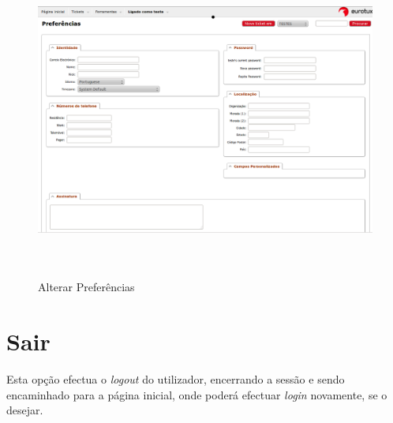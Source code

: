 \begin{figure}[H]
\begin{center}
\includegraphics[width=16cm,height=10.5cm]{include/img/rt5-1-PT}
\end{center}
\caption{Alterar Preferências}
\label{fig:boot}
\end{figure}

\section{Sair}
Esta opção efectua o \textit{logout} do utilizador, encerrando a sessão e sendo encaminhado para a página inicial, onde poderá efectuar \textit{login} novamente, se o desejar.



